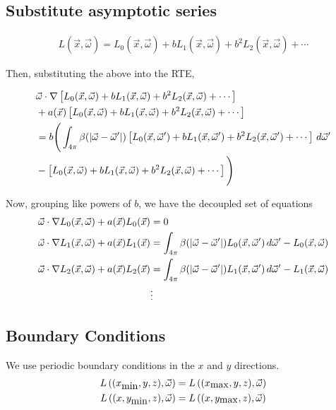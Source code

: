 \subsection{Substitute asymptotic series}
\newcommand{\Lasym}{L_0(\vec{x},\vec{\omega}) + b L_1(\vec{x},\vec{\omega}) + b^2 L_2(\vec{x},\vec{\omega}) + \cdots}
\newcommand{\Lasymp}{L_0(\vec{x},\vec{\omega}') + b L_1(\vec{x},\vec{\omega}') + b^2 L_2(\vec{x},\vec{\omega}') + \cdots}
\begin{align}
  L(\vec{x},\vec{\omega}) = \Lasym
\end{align}

Then, substituting the above into the RTE,

\begin{equation}
  \begin{split}
    &\vec{\omega} \cdot \nabla \left[ \Lasym \right] \\
    &+ a(\vec{x}) \left[ \Lasym \right] \\
    &= b\Bigg(
      \int_{4\pi} \beta(\abs{\vec{\omega} - \vec{\omega}'})
      \left[ \Lasymp \right] \, d\vec{\omega}' \\
    &- \left[ \Lasym \right]
    \Bigg)
    \end{split}
\end{equation}

Now, grouping like powers of $b$, we have the decoupled set of equations
\begin{align}
  \vec{\omega} \cdot \nabla L_0(\vec{x}, \vec{\omega}) + a(\vec{x})L_0(\vec{x}) &= 0 \\
  \vec{\omega} \cdot \nabla L_1(\vec{x}, \vec{\omega}) + a(\vec{x})L_1(\vec{x})
  &= \int_{4\pi} \beta(\left| \vec{\omega} - \vec{\omega}' \right|) L_0(\vec{x}, \vec{\omega}')\,d\vec{\omega}' - L_0(\vec{x}, \vec{\omega}) \\ 
  \vec{\omega} \cdot \nabla L_2(\vec{x}, \vec{\omega}) + a(\vec{x})L_2(\vec{x})
  &= \int_{4\pi} \beta(\left| \vec{\omega} - \vec{\omega}' \right|) L_1(\vec{x}, \vec{\omega}')\,d\vec{\omega}' - L_1(\vec{x}, \vec{\omega}) \\ 
  &\vdots \nonumber
\end{align}

\subsection{Boundary Conditions}

We use periodic boundary conditions in the $x$ and $y$ directions.
\begin{align}
  L\left((x_{\mbox{min}}, y, z), \vec{\omega}\right) &= L\left((x_{\mbox{max}}, y, z), \vec{\omega}\right) \\
  L\left((x, y_{\mbox{min}}, z), \vec{\omega}\right) &= L\left((x, y_{\mbox{max}}, z), \vec{\omega}\right)
\end{align}

